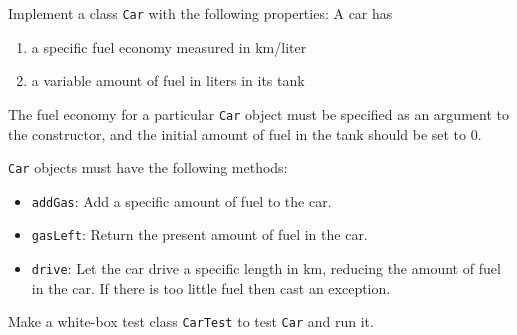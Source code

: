 \label{ex:car}
Implement a class \lstinline{Car} with the following properties: A car has 
\begin{enumerate}
\item a specific fuel economy measured in km/liter
\item a variable amount of fuel in liters in its tank
\end{enumerate}
The fuel economy for a particular \lstinline{Car} object must be specified as an argument to the constructor, and the initial amount of fuel in the tank should be set to 0.

\lstinline{Car} objects must have the following methods:
\begin{itemize}
\item \lstinline{addGas}: Add a specific amount of fuel to the car.
\item \lstinline{gasLeft}: Return the present amount of fuel in the car.
\item \lstinline{drive}: Let the car drive a specific length in km, reducing the amount of fuel in the car. If there is too little fuel then cast an exception.
\end{itemize}
Make a white-box test class \lstinline{CarTest} to test \texttt{Car} and run it.
